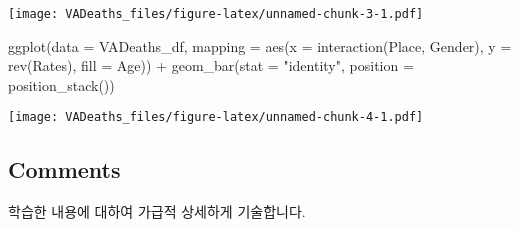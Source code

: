 \documentclass[
]{article}
\newenvironment{Shaded}{\begin{snugshade}}{\end{snugshade}}
\newcommand{\AttributeTok}[1]{\textcolor[rgb]{0.77,0.63,0.00}{#1}}
\newcommand{\FunctionTok}[1]{\textcolor[rgb]{0.00,0.00,0.00}{#1}}
\newcommand{\NormalTok}[1]{#1}
\newcommand{\SpecialCharTok}[1]{\textcolor[rgb]{0.00,0.00,0.00}{#1}}
\newcommand{\StringTok}[1]{\textcolor[rgb]{0.31,0.60,0.02}{#1}}
\begin{document}
\texttt{[image: VADeaths\_files/figure-latex/unnamed-chunk-3-1.pdf]}

\begin{Shaded}
\begin{Highlighting}[]
\FunctionTok{ggplot}\NormalTok{(}\AttributeTok{data =}\NormalTok{ VADeaths\_df,}
              \AttributeTok{mapping =} \FunctionTok{aes}\NormalTok{(}\AttributeTok{x =} \FunctionTok{interaction}\NormalTok{(Place, Gender), }
                            \AttributeTok{y =} \FunctionTok{rev}\NormalTok{(Rates), }
                            \AttributeTok{fill =}\NormalTok{ Age)) }\SpecialCharTok{+}
\FunctionTok{geom\_bar}\NormalTok{(}\AttributeTok{stat =} \StringTok{"identity"}\NormalTok{, }
         \AttributeTok{position =} \FunctionTok{position\_stack}\NormalTok{())}
\end{Highlighting}
\end{Shaded}

\texttt{[image: VADeaths\_files/figure-latex/unnamed-chunk-4-1.pdf]}

\hypertarget{comments}{%
\subsection{Comments}\label{comments}}

학습한 내용에 대하여 가급적 상세하게 기술합니다.
\end{document}
